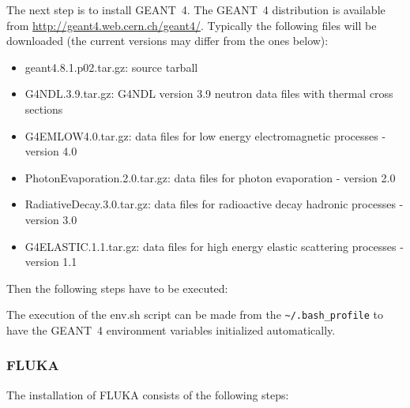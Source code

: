 \documentclass[12pt,a4paper,twoside]{article}
\begin{document}
The next step is to install GEANT~4. The GEANT~4 distribution is available from
\url{http://geant4.web.cern.ch/geant4/}. Typically the following files
will be downloaded (the current versions may differ from the ones below): 
\begin{itemize}
\item geant4.8.1.p02.tar.gz: source tarball
\item G4NDL.3.9.tar.gz: G4NDL version 3.9 neutron data files with thermal cross sections
\item G4EMLOW4.0.tar.gz: data files for low energy electromagnetic processes - version 4.0
\item PhotonEvaporation.2.0.tar.gz: data files for photon evaporation - version 2.0
\item RadiativeDecay.3.0.tar.gz: data files for radioactive decay hadronic processes - version 3.0
\item G4ELASTIC.1.1.tar.gz: data files for high energy elastic scattering processes - version 1.1
\end{itemize}

Then the following steps have to be executed:



The execution of the env.sh script can be made from the
\texttt{\~{}/.bash\_profile} to have the GEANT~4 environment variables
initialized automatically.

\subsubsection{FLUKA}

The installation of FLUKA\cite{FLUKA} consists of the following steps:
\end{document}
